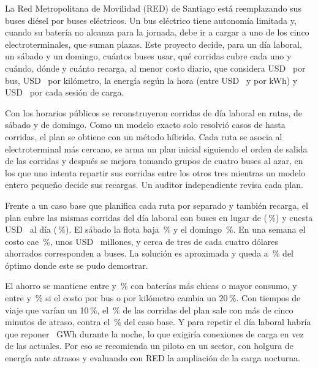 La Red Metropolitana de Movilidad (RED) de Santiago está reemplazando sus buses diésel por buses eléctricos. Un bus eléctrico tiene autonomía limitada y, cuando su batería no alcanza para la jornada, debe ir a cargar a uno de los cinco electroterminales, que suman \PlazasTotales{} plazas. Este proyecto decide, para un día laboral, un sábado y un domingo, cuántos buses usar, qué corridas cubre cada uno y cuándo, dónde y cuánto recarga, al menor costo diario, que considera USD~\CostoBus{} por bus, USD~\CostoKmUnit{} por kilómetro, la energía según la hora (entre USD~\TarifaMin{} y \TarifaMax{} por kWh) y USD~\CostoSesion{} por cada sesión de carga.

Con los horarios públicos se reconstruyeron \CorridasLaboral{} corridas de día laboral en \RutasLaboral{} rutas, \CorridasSabado{} de sábado y \CorridasDomingo{} de domingo. Como un modelo exacto solo resolvió casos de hasta \CorridasRutasDiez{} corridas, el plan se obtiene con un método híbrido. Cada ruta se asocia al electroterminal más cercano, se arma un plan inicial siguiendo el orden de salida de las corridas y después se mejora tomando grupos de cuatro buses al azar, en los que uno intenta repartir sus corridas entre los otros tres mientras un modelo entero pequeño decide sus recargas. Un auditor independiente revisa cada plan.

Frente a un caso base que planifica cada ruta por separado y también recarga, el plan cubre las mismas corridas del día laboral con \BusesPlanLaboral{} buses en lugar de \BusesBaseLaboral{} (\DeltaPctBusesLaboral\,\%) y cuesta USD~\CostoPlanLaboral{} al día (\DeltaPctCostoLaboral\,\%). El sábado la flota baja \BajaBusesSabado\,\% y el domingo \BajaBusesDomingo\,\%. En una semana el costo cae \BajaSemana\,\%, unos USD~\AhorroSemanaMillones{} millones, y cerca de tres de cada cuatro dólares ahorrados corresponden a buses. La solución es aproximada y queda a \BrechaCuartetos\,\% del óptimo donde este se pudo demostrar.

El ahorro se mantiene entre \FisAhorroMin{} y \FisAhorroMax\,\% con baterías más chicas o mayor consumo, y entre \CostosAhorroMin{} y \CostosAhorroMax\,\% si el costo por bus o por kilómetro cambia un 20\,\%. Con tiempos de viaje que varían un 10\,\%, el \AtrasadasPlanDiez\,\% de las corridas del plan sale con más de cinco minutos de atraso, contra el \AtrasadasBaseDiez\,\% del caso base. Y para repetir el día laboral habría que reponer \ReponerGwhLaboral{}~GWh durante la noche, lo que exigiría \ConexionesNecesariasLaboral{} conexiones de carga en vez de las \ConexionesTotales{} actuales. Por eso se recomienda un piloto en un sector, con holgura de energía ante atrasos y evaluando con RED la ampliación de la carga nocturna.
